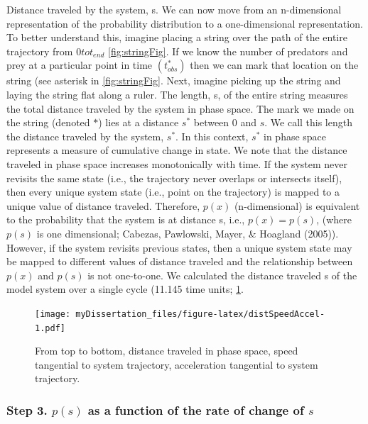 \documentclass[12pt,twoside]{reedthesis}
\begin{document}
Distance traveled by the system, s. We can now move from an
n-dimensional representation of the probability distribution to a
one-dimensional representation. To better understand this, imagine
placing a string over the path of the entire trajectory from
\(0 to t_{end}\) \ref{fig:stringFig}. If we know the number of predators
and prey at a particular point in time \((t_{obs}^*)\) then we can mark
that location on the string (see asterisk in \ref{fig:stringFig}. Next,
imagine picking up the string and laying the string flat along a ruler.
The length, s, of the entire string measures the total distance traveled
by the system in phase space. The mark we made on the string (denoted
\(*\)) lies at a distance \(s^*\) between 0 and \(s\). We call this
length the distance traveled by the system, \(s^*\). In this context,
\(s^*\) in phase space represents a measure of cumulative change in
state. We note that the distance traveled in phase space increases
monotonically with time. If the system never revisits the same state
(i.e., the trajectory never overlaps or intersects itself), then every
unique system state (i.e., point on the trajectory) is mapped to a
unique value of distance traveled. Therefore, \(p(x)\) (n-dimensional)
is equivalent to the probability that the system is at distance s, i.e.,
\(p(x)=p(s)\), (where \(p(s)\) is one dimensional; Cabezas, Pawlowski,
Mayer, \& Hoagland (2005)). However, if the system revisits previous
states, then a unique system state may be mapped to different values of
distance traveled and the relationship between \(p(x)\) and \(p(s)\) is
not one-to-one. We calculated the distance traveled s of the model
system over a single cycle (11.145 time units; \ref{fig:distSpeedAccel}.
\begin{figure}
\centering
\texttt{[image: myDissertation\_files/figure-latex/distSpeedAccel-1.pdf]}
\caption{\label{fig:distSpeedAccel}From top to bottom, distance traveled in
phase space, speed tangential to system trajectory, acceleration
tangential to system trajectory.}
\end{figure}
\subsubsection{\texorpdfstring{\textbf{Step 3.} \(p(s)\) as a function
of the rate of change of
\(s\)}{Step 3. p(s) as a function of the rate of change of s}}\label{step-3.-ps-as-a-function-of-the-rate-of-change-of-s}
\end{document}
